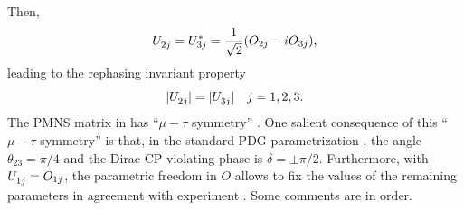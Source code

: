 \documentclass[12pt,a4paper]{article}
\begin{document}
Then,
\begin{equation}\label{eq:PMNS:01}
 \U{2j}=\Uc{3j}=\frac{1}{\sqrt 2}(O_{2j}-iO_{3j}),
\end{equation}
leading to the rephasing invariant property 
\begin{equation}\label{eq:PMNS:02}
|\U{2j}|=|\U{3j}|\quad j=1,2,3.
\end{equation}
The PMNS matrix in  has ``$\mu-\tau$ symmetry'' \cite{Harrison:2002et}. One salient consequence of this ``$\mu-\tau$ symmetry'' is that, in the standard PDG parametrization \cite{Chau:1984fp,ParticleDataGroup:2022pth}, the angle $\theta_{23}=\pi/4$ and the Dirac CP violating phase is $\delta=\pm\pi/2$. Furthermore, with $\U{1j}=O_{1j}$, the parametric freedom in $O$ allows to fix the values of the remaining parameters  in agreement with experiment \cite{Gonzalez-Garcia:2021dve,deSalas:2020pgw}. Some comments are in order.
\end{document}
